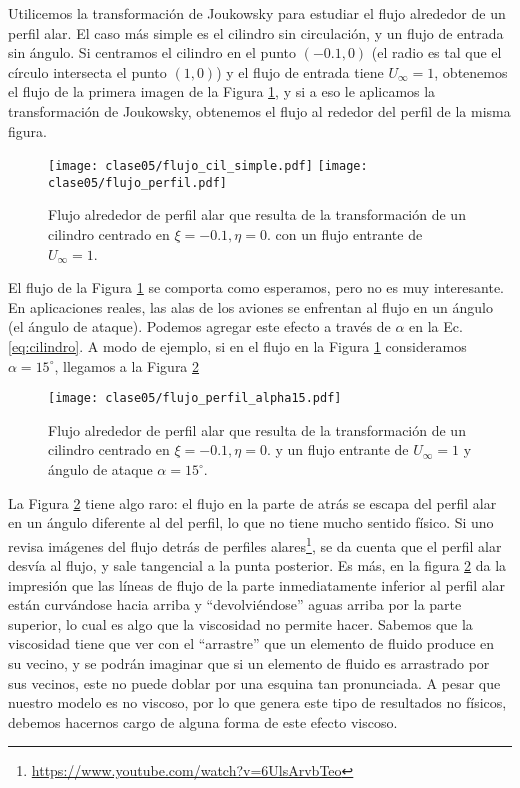 Utilicemos la transformación de Joukowsky para estudiar el flujo alrededor de un perfil alar.
El caso más simple es el cilindro sin circulación, y un flujo de entrada sin ángulo.
Si centramos el cilindro en el punto $(-0.1,0)$ (el radio es tal que el círculo intersecta el punto $(1,0)$) y el flujo de entrada tiene $U_\infty=1$, obtenemos el flujo de la primera imagen de la Figura \ref{fig:flujo_cil_simple}, y si a eso le aplicamos la transformación de Joukowsky, obtenemos el flujo al rededor del perfil de la misma figura.
%
\begin{figure}[h!]
\centering
\texttt{[image: clase05/flujo\_cil\_simple.pdf]}
\texttt{[image: clase05/flujo\_perfil.pdf]}
\caption{Flujo alrededor de perfil alar que resulta de la transformación de un cilindro centrado en $\xi=-0.1, \eta=0.$ con un flujo entrante de $U_\infty=1$.}\label{fig:flujo_cil_simple}
\end{figure}

El flujo de la Figura \ref{fig:flujo_cil_simple} se comporta como esperamos, pero no es muy interesante.
En aplicaciones reales, las alas de los aviones se enfrentan al flujo en un ángulo (el ángulo de ataque).
Podemos agregar este efecto a través de $\alpha$ en la Ec. \eqref{eq:cilindro}.
A modo de ejemplo, si en el flujo en la Figura \ref{fig:flujo_cil_simple} consideramos $\alpha=15^\circ$, llegamos a la Figura \ref{fig:flujo_perfil_alpha15} 
%
\begin{figure}[h!]
\centering
\texttt{[image: clase05/flujo\_perfil\_alpha15.pdf]}
\caption{Flujo alrededor de perfil alar que resulta de la transformación de un cilindro centrado en $\xi=-0.1, \eta=0.$ y un flujo entrante de $U_\infty=1$ y ángulo de ataque $\alpha=15^\circ$.}\label{fig:flujo_perfil_alpha15}
\end{figure}

La Figura \ref{fig:flujo_perfil_alpha15} tiene algo raro: el flujo en la parte de atrás se escapa del perfil alar en un ángulo diferente al del perfil, lo que no tiene mucho sentido físico.
Si uno revisa imágenes del flujo detrás de perfiles alares\footnote{\url{https://www.youtube.com/watch?v=6UlsArvbTeo}}, se da cuenta que el perfil alar desvía al flujo, y sale tangencial a la punta posterior.
Es más, en la figura \ref{fig:flujo_perfil_alpha15} da la impresión que las líneas de flujo de la parte inmediatamente inferior al perfil alar están curvándose hacia arriba y ``devolviéndose'' aguas arriba por la parte superior, lo cual es algo que la viscosidad no permite hacer.
Sabemos que la viscosidad tiene que ver con el ``arrastre'' que un elemento de fluido produce en su vecino, y se podrán imaginar que si un elemento de fluido es arrastrado por sus vecinos, este no puede doblar por una esquina tan pronunciada.
A pesar que nuestro modelo es no viscoso, por lo que genera este tipo de resultados no físicos, debemos hacernos cargo de alguna forma de este efecto viscoso.

